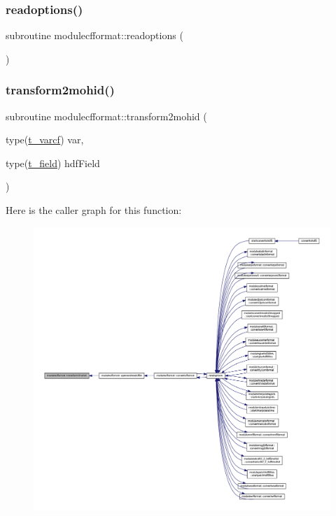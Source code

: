 \subsubsection{\texorpdfstring{readoptions()}{readoptions()}}
{\footnotesize\ttfamily subroutine modulecfformat\+::readoptions (\begin{DoxyParamCaption}{ }\end{DoxyParamCaption})\hspace{0.3cm}{\ttfamily [private]}}

\mbox{\label{namespacemodulecfformat_ada4be4f435cac7bea17a9c4f77f22009}} 
\subsubsection{\texorpdfstring{transform2mohid()}{transform2mohid()}}
{\footnotesize\ttfamily subroutine modulecfformat\+::transform2mohid (\begin{DoxyParamCaption}\item[{type(\mbox{\hyperlink{structncdflib_1_1t__varcf}{t\+\_\+varcf}})}]{var,  }\item[{type(\mbox{\hyperlink{structmodulecfformat_1_1t__field}{t\+\_\+field}})}]{hdf\+Field }\end{DoxyParamCaption})\hspace{0.3cm}{\ttfamily [private]}}

Here is the caller graph for this function\+:\nopagebreak
\begin{figure}[H]
\begin{center}
\leavevmode
\includegraphics[width=350pt]{namespacemodulecfformat_ada4be4f435cac7bea17a9c4f77f22009_icgraph}
\end{center}
\end{figure}


